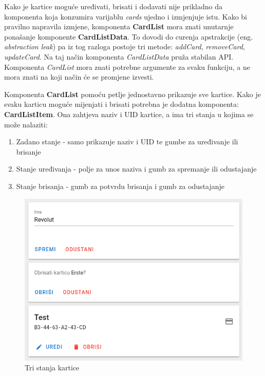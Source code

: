 Kako je kartice moguće uređivati, brisati i dodavati nije prikladno da komponenta koja konzumira varijablu \textit{cards}
ujedno i izmjenjuje istu.
Kako bi pravilno napravila izmjene, komponenta \textbf{CardList} mora znati unutarnje ponašanje komponente \textbf{CardListData}.
To dovodi do curenja apstrakcije (eng. \textit{abstraction leak}) pa iz tog razloga postoje tri metode:
\textit{addCard}, \textit{removeCard}, \textit{updateCard}.
Na taj način komponenta \textit{CardListData} pruža stabilan API. Komponenta \textit{CardList} mora znati potrebne argumente
za svaku funkciju, a ne mora znati na koji način će se promjene izvesti.

Komponenta \textbf{CardList} pomoću petlje jednostavno prikazuje sve kartice.
Kako je svaku karticu moguće mijenjati i brisati potrebna je dodatna komponenta: \textbf{CardListItem}.
Ona zahtjeva naziv i UID kartice, a ima tri stanja u kojima se može nalaziti:

\begin{enumerate}
    \item Zadano stanje - samo prikazuje naziv i UID te gumbe za uređivanje ili brisanje
    \item Stanje uređivanja - polje za unos naziva i gumb za spremanje ili odustajanje
    \item Stanje brisanja - gumb za potvrdu brisanja i gumb za odustajanje
\end{enumerate}

\pagebreak

\begin{figure}[h!]
    \centering
    \includegraphics[scale=0.5]{images/card-states}
    \caption{Tri stanja kartice}
    \label{fig:card-states}
\end{figure}

